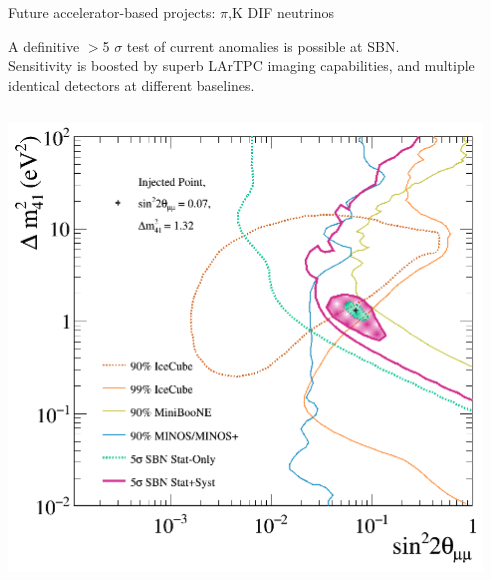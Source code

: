 \begin{frame}[t]{Future accelerator-based projects: $\pi$,K DIF neutrinos}

  {\small
    A definitive $>$5 $\sigma$ test of current anomalies is possible at SBN.\\
    Sensitivity is boosted by superb LArTPC imaging capabilities, and
    multiple identical detectors at different baselines.\\
  }

  \begin{columns}[T]
    \begin{column}{0.50\textwidth}
      \begin{center}
        \includegraphics[width=0.99\textwidth]{./images/beyond3nu/sbn_a}
      \end{center}
    \end{column}
    \begin{column}{0.50\textwidth}
    \end{column}
  \end{columns}

\end{frame}

